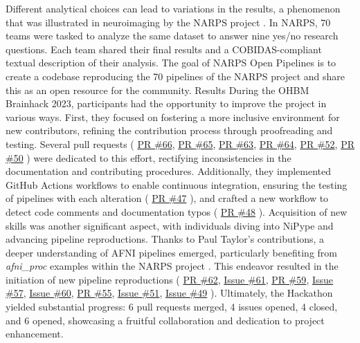 \documentclass{article}
\begin{document}
Different analytical choices can lead to variations in the results, a phenomenon that was illustrated in neuroimaging by the NARPS project \cite{botvinik2020}. In NARPS, 70 teams were tasked to analyze the same dataset to answer nine yes/no research questions. Each team shared their final results and a COBIDAS-compliant \cite{nichols2017} textual description of their analysis. The goal of NARPS Open Pipelines is to create a codebase reproducing the 70 pipelines of the NARPS project and share this as an open resource for the community.
Results 
During the OHBM Brainhack 2023, participants had the opportunity to improve the project in various ways. First, they focused on fostering a more inclusive environment for new contributors, refining the contribution process through proofreading and testing. Several pull requests (
\href{https://github.com/Inria-Empenn/narps_open_pipelines/pull/66}{PR \#66},
\href{https://github.com/Inria-Empenn/narps_open_pipelines/pull/65}{PR \#65},
\href{https://github.com/Inria-Empenn/narps_open_pipelines/pull/63}{PR \#63},
\href{https://github.com/Inria-Empenn/narps_open_pipelines/pull/64}{PR \#64},
\href{https://github.com/Inria-Empenn/narps_open_pipelines/pull/52}{PR \#52},
\href{https://github.com/Inria-Empenn/narps_open_pipelines/pull/50}{PR \#50}
) were dedicated to this effort, rectifying inconsistencies in the documentation and contributing procedures.
Additionally, they implemented GitHub Actions workflows to enable continuous integration, ensuring the testing of pipelines with each alteration (
\href{https://github.com/Inria-Empenn/narps_open_pipelines/pull/47}{PR \#47}
), and crafted a new workflow to detect code comments and documentation typos (
\href{https://github.com/Inria-Empenn/narps_open_pipelines/pull/48}{PR \#48}
).
Acquisition of new skills was another significant aspect, with individuals diving into NiPype and advancing pipeline reproductions. Thanks to Paul Taylor's contributions, a deeper understanding of AFNI pipelines emerged, particularly benefiting from \textit{afni\_proc} examples within the NARPS project \cite{taylor2023}. This endeavor resulted in the initiation of new pipeline reproductions (
\href{https://github.com/Inria-Empenn/narps_open_pipelines/pull/62}{PR \#62},
\href{https://github.com/Inria-Empenn/narps_open_pipelines/issues/61}{Issue \#61},
\href{https://github.com/Inria-Empenn/narps_open_pipelines/pull/59}{PR \#59},
\href{https://github.com/Inria-Empenn/narps_open_pipelines/issues/57}{Issue \#57},
\href{https://github.com/Inria-Empenn/narps_open_pipelines/issues/60}{Issue \#60},
\href{https://github.com/Inria-Empenn/narps_open_pipelines/pull/55}{PR \#55},
\href{https://github.com/Inria-Empenn/narps_open_pipelines/issues/51}{Issue \#51},
\href{https://github.com/Inria-Empenn/narps_open_pipelines/issues/49}{Issue \#49}
).
Ultimately, the Hackathon yielded substantial progress: 6 pull requests merged, 4 issues opened, 4 closed, and 6 opened, showcasing a fruitful collaboration and dedication to project enhancement.
\end{document}
